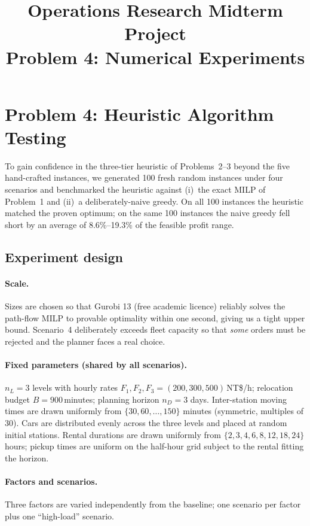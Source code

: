 \documentclass[a4paper,12pt]{article}
\title{Operations Research Midterm Project \\ \textbf{Problem 4: Numerical Experiments}}
\author{}
\date{}
\begin{document}
\maketitle

\section*{Problem 4: Heuristic Algorithm Testing}

To gain confidence in the three-tier heuristic of Problems~2--3 beyond
the five hand-crafted instances, we generated 100 fresh random instances
under four scenarios and benchmarked the heuristic against
(i)~the exact MILP of Problem~1 and (ii)~a deliberately-naive greedy.
On all 100 instances the heuristic matched the proven optimum;
on the same 100 instances the naive greedy fell short by an
average of 8.6\%--19.3\% of the feasible profit range.

\subsection*{Experiment design}

\paragraph{Scale.}
Sizes are chosen so that Gurobi 13 (free academic licence) reliably solves
the path-flow MILP to provable optimality within one second, giving us a
tight upper bound. Scenario~4 deliberately exceeds fleet capacity so that
\emph{some} orders must be rejected and the planner faces a real choice.

\paragraph{Fixed parameters (shared by all scenarios).}
$n_L = 3$ levels with hourly rates $F_1, F_2, F_3 = (200, 300, 500)$\,NT\$/h;
relocation budget $B = 900$\,minutes; planning horizon
$n_D = 3$ days. Inter-station moving times are drawn uniformly from
$\{30, 60, \ldots, 150\}$ minutes (symmetric, multiples of 30). Cars are
distributed evenly across the three levels and placed at random initial stations.
Rental durations are drawn uniformly from
$\{2, 3, 4, 6, 8, 12, 18, 24\}$ hours; pickup times are uniform on the
half-hour grid subject to the rental fitting the horizon.

\paragraph{Factors and scenarios.}
Three factors are varied independently from the baseline; one scenario
per factor plus one ``high-load'' scenario.
\end{document}
